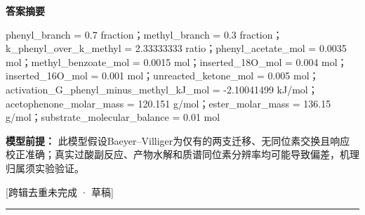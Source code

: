 \documentclass[UTF8,11pt,a4paper]{ctexart}
\begin{document}
\noindent\textbf{答案摘要}\par
phenyl\_branch = 0.7 fraction；methyl\_branch = 0.3 fraction；k\_phenyl\_over\_k\_methyl = 2.33333333 ratio；phenyl\_acetate\_mol = 0.0035 mol；methyl\_benzoate\_mol = 0.0015 mol；inserted\_18O\_mol = 0.004 mol；inserted\_16O\_mol = 0.001 mol；unreacted\_ketone\_mol = 0.005 mol；activation\_G\_phenyl\_minus\_methyl\_kJ\_mol = -2.10041499 kJ/mol；acetophenone\_molar\_mass = 120.151 g/mol；ester\_molar\_mass = 136.15 g/mol；substrate\_molecular\_balance = 0.01 mol\par
\noindent\textbf{模型前提：}
此模型假设Baeyer–Villiger为仅有的两支迁移、无同位素交换且响应校正准确；真实过酸副反应、产物水解和质谱同位素分辨率均可能导致偏差，机理归属须实验验证。\par
\noindent\textcolor{red!65!black}{[跨辑去重未完成 · 草稿]} \par
\medskip\hrule\medskip
{}
\end{document}
